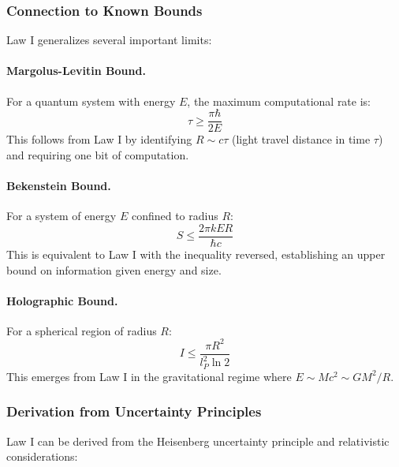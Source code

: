 \documentclass[11pt,a4paper]{article}
\theoremstyle{plain}
\theoremstyle{definition}
\theoremstyle{remark}
\begin{document}
\subsubsection{Connection to Known Bounds}

Law I generalizes several important limits:

\paragraph{Margolus-Levitin Bound.} For a quantum system with energy $E$, the maximum computational rate is:
\begin{equation}
\tau \geq \frac{\pi\hbar}{2E}
\end{equation}
This follows from Law I by identifying $R \sim c\tau$ (light travel distance in time $\tau$) and requiring one bit of computation.

\paragraph{Bekenstein Bound.} For a system of energy $E$ confined to radius $R$:
\begin{equation}
S \leq \frac{2\pi kER}{\hbar c}
\end{equation}
This is equivalent to Law I with the inequality reversed, establishing an upper bound on information given energy and size.

\paragraph{Holographic Bound.} For a spherical region of radius $R$:
\begin{equation}
I \leq \frac{\pi R^2}{l_P^2\ln 2}
\end{equation}
This emerges from Law I in the gravitational regime where $E \sim Mc^2 \sim GM^2/R$.

\subsubsection{Derivation from Uncertainty Principles}

Law I can be derived from the Heisenberg uncertainty principle and relativistic considerations:
\end{document}
